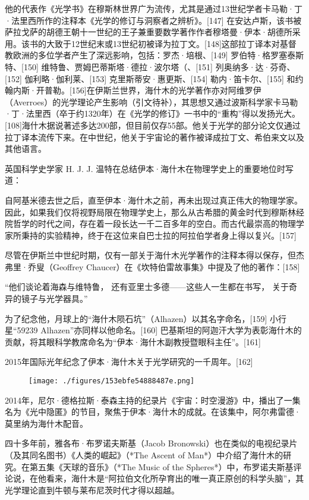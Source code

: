 他的代表作《光学书》在穆斯林世界广为流传，尤其是通过13世纪学者卡马勒·丁·法里西所作的注释本《光学的修订与洞察者之辨析》。[147] 在安达卢斯，该书被萨拉戈萨的胡德王朝十一世纪的王子兼重要数学著作作者穆塔曼·伊本·胡德所采用。该书的大致于12世纪末或13世纪初被译为拉丁文。[148]这部拉丁译本对基督教欧洲的多位学者产生了深远影响，包括：罗杰·培根、[149] 罗伯特·格罗塞泰斯特、[150] 维特鲁、贾姆巴蒂斯塔·德拉·波尔塔（、[151] 列奥纳多·达·芬奇、[152] 伽利略·伽利莱、[153] 克里斯蒂安·惠更斯、[154] 勒内·笛卡尔、[155] 和约翰内斯·开普勒。[156]在伊斯兰世界，海什木的光学著作亦对阿维罗伊（Averroes）的光学理论产生影响（引文待补），其思想又通过波斯科学家卡马勒·丁·法里西（卒于约1320年）在《光学的修订》一书中的“重构”得以发扬光大。[108]海什木据说著述多达200部，但目前仅存55部。他关于光学的部分论文仅通过拉丁译本流传下来。在中世纪，他关于宇宙论的著作被译成拉丁文、希伯来文以及其他语言。

英国科学史学家 H. J. J. 温特在总结伊本·海什木在物理学史上的重要地位时写道：

自阿基米德去世之后，直至伊本·海什木之前，再未出现过真正伟大的物理学家。因此，如果我们仅将视野局限在物理学史上，那么从古希腊的黄金时代到穆斯林经院哲学的时代之间，存在着一段长达一千二百多年的空白。而古代最崇高的物理学家所秉持的实验精神，终于在这位来自巴士拉的阿拉伯学者身上得以复兴。[157]

尽管在伊斯兰中世纪时期，仅有一部关于海什木光学著作的注释本得以保存，但杰弗里·乔叟（Geoffrey Chaucer）在《坎特伯雷故事集》中提及了他的著作：[158]

“他们谈论着海森与维特鲁，
还有亚里士多德——这些人一生都在书写，
关于奇异的镜子与光学器具。”

为了纪念他，月球上的“海什木陨石坑”（Alhazen）以其名字命名，[159] 小行星“59239 Alhazen”亦同样以他命名。[160] 巴基斯坦的阿迦汗大学为表彰海什木的贡献，将其眼科学教席命名为“伊本·海什木副教授暨眼科主任”。[161]

2015年国际光年纪念了伊本·海什木关于光学研究的一千周年。[162]
\begin{figure}[ht]
\centering
\texttt{[image: ./figures/153ebfe54888487e.png]}
\caption{} \label{fig_YBH_6}
\end{figure}
2014年，尼尔·德格拉斯·泰森主持的纪录片《宇宙：时空漫游》中，播出了一集名为《光中隐匿》的节目，聚焦于伊本·海什木的成就。在该集中，阿尔弗雷德·莫里纳为海什木配音。

四十多年前，雅各布·布罗诺夫斯基（Jacob Bronowski）也在类似的电视纪录片（及其同名图书）《人类的崛起》（*The Ascent of Man*）中介绍了海什木的研究。在第五集《天球的音乐》（*The Music of the Spheres*）中，布罗诺夫斯基评论说，在他看来，海什木是“阿拉伯文化所孕育出的唯一真正原创的科学头脑”，其光学理论直到牛顿与莱布尼茨时代才得以超越。

